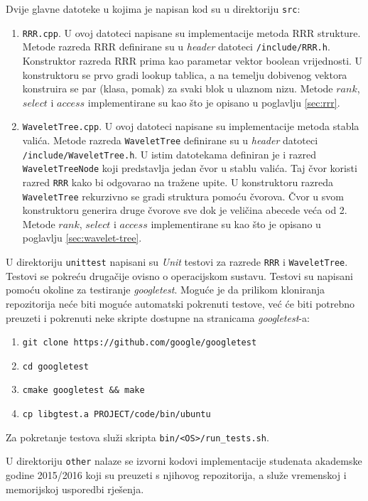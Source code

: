 \documentclass[times, utf8, seminar, numeric]{fer}
\begin{document}
Dvije glavne datoteke u kojima je napisan kod su u direktoriju \texttt{src}:
\begin{enumerate}
	\item \texttt{RRR.cpp}. U ovoj datoteci napisane su implementacije metoda RRR strukture. Metode razreda RRR definirane su u \textit{header} datoteci \texttt{/include/RRR.h}. Konstruktor razreda RRR prima kao parametar vektor boolean vrijednosti. U konstruktoru se prvo gradi lookup tablica, a na temelju dobivenog vektora konstruira se par (klasa, pomak) za svaki blok u ulaznom nizu. Metode $rank$, $select$ i $access$ implementirane su kao što je opisano u poglavlju \ref{sec:rrr}.
	
	\item \texttt{WaveletTree.cpp}. U ovoj datoteci napisane su implementacije metoda stabla valića. Metode razreda \texttt{WaveletTree} definirane su u \textit{header} datoteci \texttt{/include/WaveletTree.h}. U istim datotekama definiran je i razred \texttt{WaveletTreeNode} koji predstavlja jedan čvor u stablu valića. Taj čvor koristi razred \texttt{RRR} kako bi odgovarao na tražene upite. U konstruktoru razreda \texttt{WaveletTree} rekurzivno se gradi struktura pomoću čvorova. Čvor u svom konstruktoru generira druge čvorove sve dok je veličina abecede veća od 2. Metode $rank$, $select$ i $access$ implementirane su kao što je opisano u poglavlju \ref{sec:wavelet-tree}.
\end{enumerate}

U direktoriju \texttt{unittest} napisani su \textit{Unit} testovi za razrede \texttt{RRR} i \texttt{WaveletTree}. Testovi se pokreću drugačije ovisno o operacijskom sustavu. Testovi su napisani pomoću okoline za testiranje \textit{googletest}. Moguće je da prilikom kloniranja repozitorija neće biti moguće automatski pokrenuti testove, već  će biti potrebno preuzeti i pokrenuti neke skripte dostupne na stranicama \textit{googletest}-a:
\begin{enumerate}
	\item \texttt{git clone https://github.com/google/googletest}
	\item \texttt{cd googletest}
	\item \texttt{cmake googletest \&\& make}
	\item \texttt{cp libgtest.a PROJECT/code/bin/ubuntu}
\end{enumerate}

Za pokretanje testova služi skripta \texttt{bin/<OS>/run\_tests.sh}.

U direktoriju \texttt{other} nalaze se izvorni kodovi implementacije studenata akademske godine 2015/2016\citep{bio-2016} koji su preuzeti s njihovog repozitorija, a služe vremenskoj i memorijskoj usporedbi rješenja.
 
\end{document}
